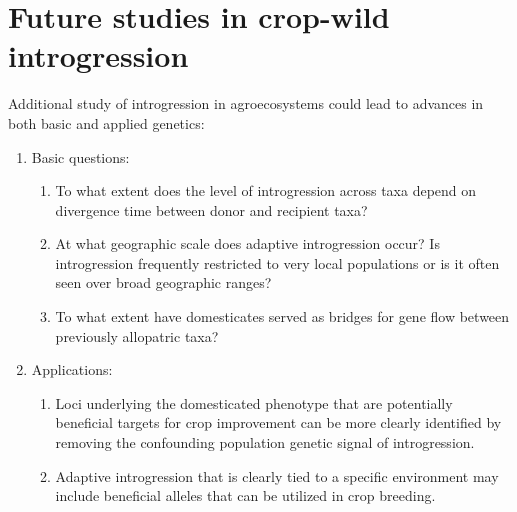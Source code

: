 \documentclass[11pt]{article}
\begin{document}
\section*{Future studies in crop-wild introgression}
Additional study of introgression in agroecosystems could lead to advances in both basic and applied genetics:
\begin{enumerate}
	\item{Basic questions:}
		\begin{enumerate}
		 	\item{To what extent does the level of introgression across taxa depend on divergence time between donor and recipient taxa?}
		 	\item{At what geographic scale does adaptive introgression occur? Is introgression frequently restricted to very local populations or is it often seen over broad geographic ranges?}
		 	\item{To what extent have domesticates served as bridges for gene flow between previously allopatric taxa?}
		\end{enumerate} 	
	\item{Applications:}
		\begin{enumerate}
		 	\item{Loci underlying the domesticated phenotype that are potentially beneficial targets for crop improvement can be more clearly identified by removing the confounding population genetic signal of introgression.}
		 	\item{Adaptive introgression that is clearly tied to a specific environment may include beneficial alleles that can be utilized in crop breeding.}
		 \end{enumerate}
\end{enumerate}



\end{document}
